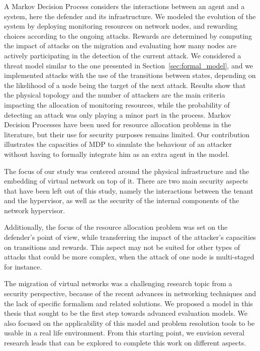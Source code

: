 A Markov Decision Process considers the interactions between an agent and a system, here the defender and its infrastructure. We modeled the evolution of the system by deploying monitoring resources on network nodes, and rewarding choices according to the ongoing attacks.
Rewards are determined by computing the impact of attacks on the migration and evaluating how many nodes are actively participating in the detection of the current attack.
We considered a threat model similar to the one presented in Section~\ref{sec:formal_model}, and we implemented attacks with the use of the transitions between states, depending on the likelihood of a node being the target of the next attack. 
Results show that the physical topology and the number of attackers are the main criteria impacting the allocation of monitoring resources, while the probability of detecting an attack was only playing a minor part in the process. 
Markov Decision Processes have been used for resource allocation problems in the literature, but their use for security purposes remains limited. Our contribution illustrates the capacities of MDP to simulate the behaviour of an attacker without having to formally integrate him as an extra agent in the model.

The focus of our study was centered around the physical infrastructure and the embedding of virtual network on top of it.
There are two main security aspects that have been left out of this study, namely the interactions between the tenant and the hypervisor, as well as the security of the internal components of the network hypervisor.

Additionally, the focus of the resource allocation problem was set on the defender's point of view, while transferring the impact of the attacker's capacities on transitions and rewards. This aspect may not be suited for other types of attacks that could be more complex, when the attack of one node is multi-staged for instance.

The migration of virtual networks was a challenging research topic from a security perspective, because of the recent advances in networking techniques and the lack of specific formalism and related solutions. We proposed a model in this thesis that sought to be the first step towards advanced evaluation models. We also focused on the applicability of this model and problem resolution tools to be usable in a real life environment. From this starting point, we envision several research leads that can be explored to complete this work on different aspects.

